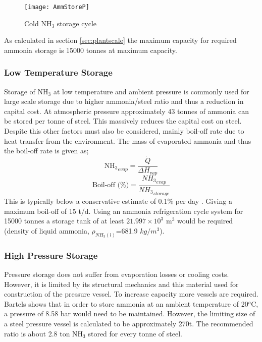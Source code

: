 \begin{wrapfigure}{r}{0.4\textwidth}
	\centering
	\texttt{[image: AmmStoreP]}
	\caption{Cold NH$_3$ storage cycle}
\end{wrapfigure}
 As calculated in  section \ref{sec:plantscale} the maximum capacity for required ammonia storage is 15000 tonnes at maximum capacity.

\subsubsection{Low Temperature Storage}

Storage of NH$_3$ at low temperature and ambient pressure is commonly used for large scale storage due to higher ammonia/steel ratio and thus a reduction in capital cost. At atmospheric pressure approximately 43 tonnes of ammonia can be stored per tonne of steel. This massively reduces the capital cost on steel. Despite this other factors must also be considered, mainly boil-off rate due to heat transfer from the environment. The mass of evaporated ammonia and thus the boil-off rate is given as;
\begin{equation}
{\text{NH}_3}_{evap} = \frac{\dot{Q}}{\Delta H_{vap}}
\end{equation}
\begin{equation}
\text{Boil-off (\%)} = \frac{{NH_3}_{evap} }{{NH_3}_{storage} }
\end{equation}
This is typically below a conservative estimate of 0.1\% per day \cite{Belapurkar2016}. Giving a maximum boil-off of 15 t/d. Using an ammonia refrigeration cycle system for 15000 tonnes a storage tank of at least $21.997\times10^3$ m$^3$ would be required (density of liquid ammonia, $\rho_{NH_3(l)}$=681.9 $kg/m^3$)\cite{Hacker2003}. 

\subsubsection{High Pressure Storage}

Pressure storage does not suffer from evaporation losses or cooling costs. However, it is limited by its structural mechanics and this material used for construction of the pressure vessel. To increase capacity more vessels are required. Bartels shows that in order to store ammonia at an ambient temperature of 20$^o$C, a pressure of 8.58 bar would need to be maintained. However, the limiting size of a steel pressure vessel is calculated to be approximately 270t. The recommended ratio is about 2.8 ton NH$_3$ stored for every tonne of steel. 

